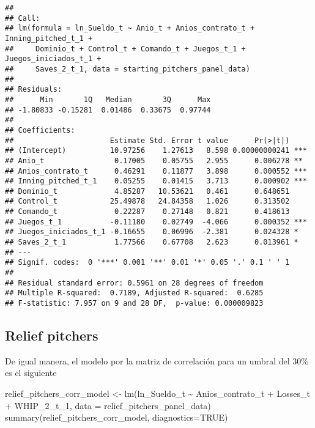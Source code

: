 \documentclass[
]{article}
\newenvironment{Shaded}{\begin{snugshade}}{\end{snugshade}}
\newcommand{\AttributeTok}[1]{\textcolor[rgb]{0.77,0.63,0.00}{#1}}
\newcommand{\ConstantTok}[1]{\textcolor[rgb]{0.00,0.00,0.00}{#1}}
\newcommand{\FunctionTok}[1]{\textcolor[rgb]{0.00,0.00,0.00}{#1}}
\newcommand{\NormalTok}[1]{#1}
\newcommand{\OtherTok}[1]{\textcolor[rgb]{0.56,0.35,0.01}{#1}}
\newcommand{\SpecialCharTok}[1]{\textcolor[rgb]{0.00,0.00,0.00}{#1}}
\begin{document}
\begin{verbatim}
## 
## Call:
## lm(formula = ln_Sueldo_t ~ Anio_t + Anios_contrato_t + Inning_pitched_t_1 + 
##     Dominio_t + Control_t + Comando_t + Juegos_t_1 + Juegos_iniciados_t_1 + 
##     Saves_2_t_1, data = starting_pitchers_panel_data)
## 
## Residuals:
##      Min       1Q   Median       3Q      Max 
## -1.80833 -0.15281  0.01486  0.33675  0.97744 
## 
## Coefficients:
##                      Estimate Std. Error t value      Pr(>|t|)    
## (Intercept)          10.97256    1.27613   8.598 0.00000000241 ***
## Anio_t                0.17005    0.05755   2.955      0.006278 ** 
## Anios_contrato_t      0.46291    0.11877   3.898      0.000552 ***
## Inning_pitched_t_1    0.05255    0.01415   3.713      0.000902 ***
## Dominio_t             4.85287   10.53621   0.461      0.648651    
## Control_t            25.49878   24.84358   1.026      0.313502    
## Comando_t             0.22287    0.27148   0.821      0.418613    
## Juegos_t_1           -0.11180    0.02749  -4.066      0.000352 ***
## Juegos_iniciados_t_1 -0.16655    0.06996  -2.381      0.024328 *  
## Saves_2_t_1           1.77566    0.67708   2.623      0.013961 *  
## ---
## Signif. codes:  0 '***' 0.001 '**' 0.01 '*' 0.05 '.' 0.1 ' ' 1
## 
## Residual standard error: 0.5961 on 28 degrees of freedom
## Multiple R-squared:  0.7189, Adjusted R-squared:  0.6285 
## F-statistic: 7.957 on 9 and 28 DF,  p-value: 0.000009823
\end{verbatim}

\subsection{Relief pitchers}

De igual manera, el modelo por la matriz de correlación para un umbral
del \(30\%\) es el siguiente

\begin{Shaded}
\begin{Highlighting}[]
\NormalTok{relief\_pitchers\_corr\_model }\OtherTok{\textless{}{-}} \FunctionTok{lm}\NormalTok{(ln\_Sueldo\_t }\SpecialCharTok{\textasciitilde{}}\NormalTok{ Anios\_contrato\_t }\SpecialCharTok{+}\NormalTok{ Losses\_t }\SpecialCharTok{+}\NormalTok{ WHIP\_2\_t\_1, }
                                               \AttributeTok{data =}\NormalTok{ relief\_pitchers\_panel\_data)}
\FunctionTok{summary}\NormalTok{(relief\_pitchers\_corr\_model, }\AttributeTok{diagnostics=}\ConstantTok{TRUE}\NormalTok{)}
\end{Highlighting}
\end{Shaded}
\end{document}
